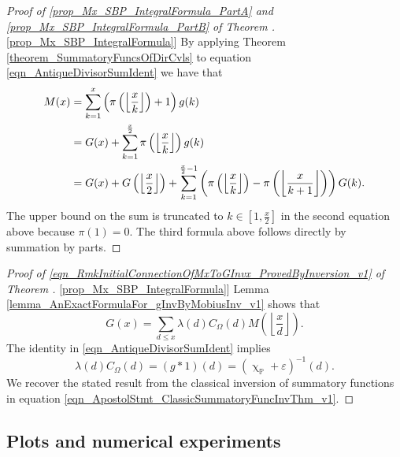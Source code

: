 \documentclass[11pt,reqno,a4letter]{article}
\newcommand{\hlocalref}[1]{\hyperref[#1]{\ref{#1}}}
\numberwithin{equation}{section}
\numberwithin{figure}{section}
\numberwithin{table}{section}
\renewcommand{\chi}{\upchi}
\newcommand{\Floor}[2]{\ensuremath{\left\lfloor \frac{#1}{#2} \right\rfloor}}
\theoremstyle{plain}
\numberwithin{theorem}{section}
\theoremstyle{definition}
\begin{document}
\begin{proof}[Proof of 
              \eqref{prop_Mx_SBP_IntegralFormula_PartA} and \eqref{prop_Mx_SBP_IntegralFormula_PartB} of 
              Theorem \hlocalref{prop_Mx_SBP_IntegralFormula}] 
By applying Theorem \hlocalref{theorem_SummatoryFuncsOfDirCvls} to 
equation \eqref{eqn_AntiqueDivisorSumIdent} we have that 
\begin{align} 
\notag
M(x) & = \sum_{k=1}^{x} \left(\pi\left(\Floor{x}{k}\right)+1\right) g(k) \\ 
\notag 
     & = G(x) + \sum_{k=1}^{\frac{x}{2}} \pi\left(\Floor{x}{k}\right) g(k) \\ 
\notag 
     & = G(x) + G\left(\Floor{x}{2}\right) + 
     \sum_{k=1}^{\frac{x}{2}-1} \left( 
     \pi\left(\Floor{x}{k}\right) - \pi\left(\Floor{x}{k+1}\right) 
	\right) G(k).
\end{align} 
The upper bound on the sum is truncated to $k \in \left[1, \frac{x}{2}\right]$ in the second equation 
above because $\pi(1) = 0$. 
The third formula above follows directly by summation by parts. 
\end{proof} 
\begin{proof}[Proof of \eqref{eqn_RmkInitialConnectionOfMxToGInvx_ProvedByInversion_v1} of 
	      Theorem \hlocalref{prop_Mx_SBP_IntegralFormula}]
Lemma \hlocalref{lemma_AnExactFormulaFor_gInvByMobiusInv_v1} shows that 
\[
G(x) = \sum_{d \leq x} \lambda(d) C_{\Omega}(d) M\left(\Floor{x}{d}\right). 
\]
The identity in \eqref{eqn_AntiqueDivisorSumIdent} implies 
$$\lambda(d) C_{\Omega}(d) = (g \ast 1)(d) = (\chi_{\mathbb{P}} + \varepsilon)^{-1}(d).$$ 
We recover the stated result from the classical inversion of summatory functions in 
equation \eqref{eqn_ApostolStmt_ClassicSummatoryFuncInvThm_v1}. 
\end{proof}

\subsection{Plots and numerical experiments}
\end{document}
